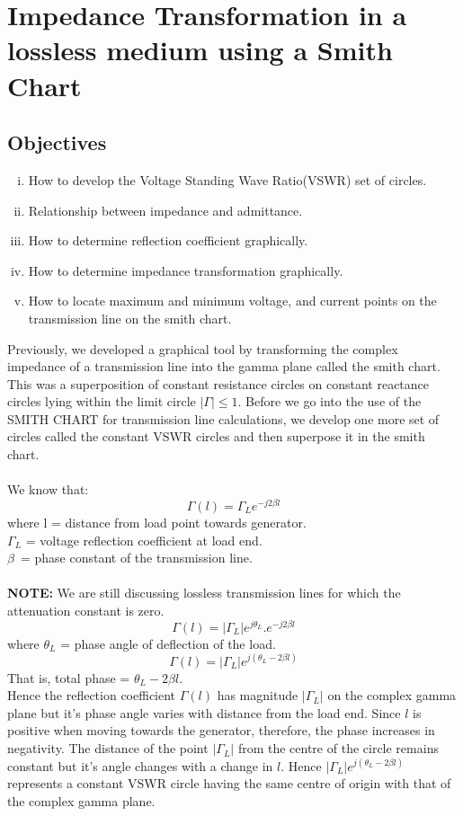 \chapter{Impedance Transformation in a lossless medium using a Smith Chart}\label{lec:lec8}
\section{Objectives}

\begin{enumerate}[(i)]
\item How to develop the Voltage Standing Wave Ratio(VSWR) set of circles.
\item Relationship between impedance and admittance.
\item How to determine reflection coefficient graphically.
\item How to determine impedance transformation graphically.
\item How to locate maximum and minimum voltage, and current points on the transmission line on the smith chart.
\end{enumerate}
Previously, we developed a graphical tool by transforming the complex impedance of a transmission line into the gamma plane called the smith chart. This was a superposition of constant resistance circles on constant reactance circles lying within the limit circle $|\Gamma| \leq 1$. Before we go into the use of the SMITH CHART for transmission line calculations, we develop one more set of circles called the constant VSWR circles and then superpose it in the smith chart.\\\\ We know that:
\begin{equation*}
\Gamma(l) =\Gamma_L e^{-j2\beta{l}}
\end{equation*}
where l = distance from load point towards generator.\\
$\Gamma_{L}$ = voltage reflection coefficient at load end.\\ 	
$\beta$\ = phase constant of the transmission line.\\\\
\textbf{NOTE:}	We are still discussing lossless transmission lines for which the attenuation constant is zero.
\begin{equation*}
\Gamma{(l)}=|\Gamma_{L}|e^{j\theta_L}.e^{-j2\beta l}
\end{equation*}
where	$\theta_L$ = phase angle of deflection of the load.
\begin{equation}
\Gamma{(l)} =|\Gamma_L|e^{j(\theta_L - 2\beta{l})}
\end{equation}
That is, total phase = $\theta_L - 2\beta{l}$.\\
Hence the reflection coefficient $\Gamma{(l)}$ has magnitude $|\Gamma_L|$ on the complex gamma plane but it's phase angle varies with distance from the load end. Since $l$ is positive when moving towards the generator, therefore, the phase increases in negativity. The distance of the point $|\Gamma_L|$ from the centre of the circle remains constant but it's angle changes with a change in $l$. Hence $|\Gamma_L|e^{j(\theta_L - 2\beta l)}$ represents a constant VSWR circle having the same centre of origin with that of the complex gamma plane.

